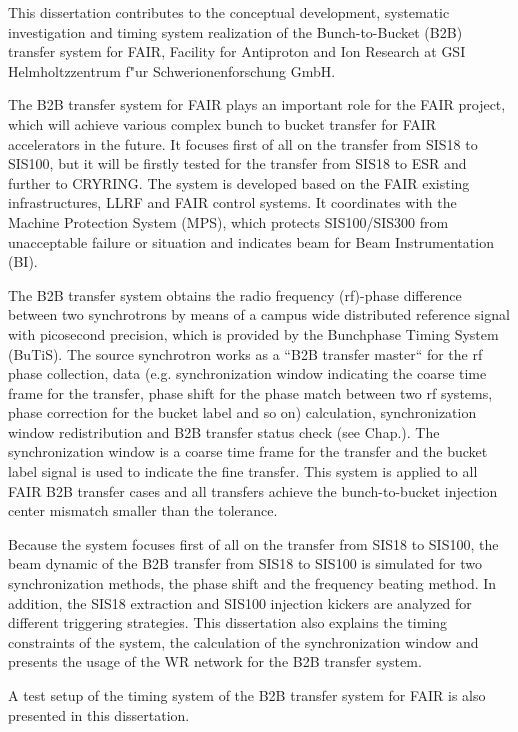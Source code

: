 This dissertation contributes to the conceptual development, systematic investigation and timing system realization of the Bunch-to-Bucket (B2B) transfer system for FAIR, Facility for Antiproton and Ion Research at GSI Helmholtzzentrum f"ur Schwerionenforschung GmbH. 

The B2B transfer system for FAIR plays an important role for the FAIR project, which will achieve various complex bunch to bucket transfer for FAIR accelerators in the future. It focuses first of all on the transfer from SIS18 to SIS100, but it will be firstly tested for the transfer from SIS18 to ESR and further to CRYRING. The system is developed based on the FAIR existing infrastructures, LLRF and FAIR control systems. It coordinates with the Machine Protection System (MPS), which protects SIS100/SIS300 from unacceptable failure or situation and indicates beam for Beam Instrumentation (BI). 
 
The B2B transfer system obtains the radio frequency (rf)-phase difference between two synchrotrons by means of a campus wide distributed reference signal with picosecond precision, which is provided by the Bunchphase Timing System (BuTiS). The source synchrotron works as a ``B2B transfer master`` for the rf phase collection, data (e.g. synchronization window indicating the coarse time frame for the transfer, phase shift for the phase match between two rf systems, phase correction for the bucket label and so on) calculation, synchronization window redistribution and B2B transfer status check (see Chap.). The synchronization window is a coarse time frame for the transfer and the bucket label signal is used to indicate the fine transfer. This system is applied to all FAIR B2B transfer cases and all transfers achieve the bunch-to-bucket injection center mismatch smaller than the tolerance.

Because the system focuses first of all on the transfer from SIS18 to SIS100, the beam dynamic of the B2B transfer from SIS18 to SIS100 is simulated for two synchronization methods, the phase shift and the frequency beating method. In addition, the SIS18 extraction and SIS100 injection kickers are analyzed for different triggering strategies. This dissertation also explains the timing constraints of the system, the calculation of the synchronization window and presents the usage of the WR network for the B2B transfer system. 

A test setup of the timing system of the B2B transfer system for FAIR is also presented in this dissertation. 
